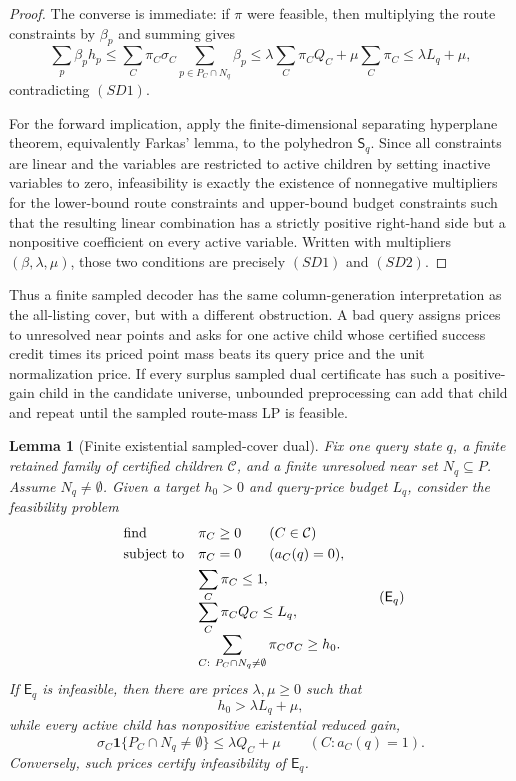 \documentclass[10pt]{article}
\newtheorem{lemma}[theorem]{Lemma}
\theoremstyle{definition}
\begin{document}
\begin{proof}
   The converse is immediate: if $\pi$ were feasible, then multiplying the
   route constraints by $\beta_p$ and summing gives
   \[
      \sum_p\beta_ph_p
      \le
      \sum_C\pi_C\sigma_C\sum_{p\in P_C\cap N_q}\beta_p
      \le
      \lambda\sum_C\pi_CQ_C+\mu\sum_C\pi_C
      \le
      \lambda L_q+\mu,
   \]
   contradicting \((SD1)\).

   For the forward implication, apply the finite-dimensional separating
   hyperplane theorem, equivalently Farkas' lemma, to the polyhedron
   $\mathsf S_q$.  Since all constraints are linear and the variables are
   restricted to active children by setting inactive variables to zero,
   infeasibility is exactly the existence of nonnegative multipliers for the
   lower-bound route constraints and upper-bound budget constraints such that
   the resulting linear combination has a strictly positive right-hand side
   but a nonpositive coefficient on every active variable.  Written with
   multipliers $(\beta,\lambda,\mu)$, those two conditions are precisely
   \((SD1)\) and \((SD2)\).
\end{proof}

Thus a finite sampled decoder has the same column-generation interpretation as
the all-listing cover, but with a different obstruction.  A bad query assigns
prices to unresolved near points and asks for one active child whose certified
success credit times its priced point mass beats its query price and the unit
normalization price.  If every surplus sampled dual certificate has such a
positive-gain child in the candidate universe, unbounded preprocessing can add
that child and repeat until the sampled route-mass LP is feasible.

\begin{lemma}[Finite existential sampled-cover dual]
   \label{lem:finite-existential-sampled-cover-dual}
   Fix one query state \(q\), a finite retained family of certified children
   \(\mathcal C\), and a finite unresolved near set
   \(N_q\subseteq P\). Assume \(N_q\ne\emptyset\).  Given a target \(h_0>0\)
   and query-price budget \(L_q\), consider the feasibility problem
   \[
   \begin{array}{ll}
   \text{\rm find} & \pi_C\ge0\qquad(C\in\mathcal C)\\[0.3em]
   \text{\rm subject to}
      & \pi_C=0\qquad(a_C(q)=0),\\[0.4em]
      & \displaystyle \sum_C\pi_C\le1,\\[0.8em]
      & \displaystyle \sum_C\pi_CQ_C\le L_q,\\[0.8em]
      & \displaystyle
        \sum_{C:\ P_C\cap N_q\ne\emptyset}\pi_C\sigma_C\ge h_0 .
   \end{array}
   \tag{$\mathsf E_q$}
   \]
   If \(\mathsf E_q\) is infeasible, then there are prices
   \(\lambda,\mu\ge0\) such that
   \[
      h_0>\lambda L_q+\mu,
      \tag{ED1}
   \]
   while every active child has nonpositive existential reduced gain,
   \[
      \sigma_C\mathbf 1\{P_C\cap N_q\ne\emptyset\}
      \le
      \lambda Q_C+\mu
      \qquad(C:a_C(q)=1).
      \tag{ED2}
   \]
   Conversely, such prices certify infeasibility of \(\mathsf E_q\).
\end{lemma}
\end{document}
